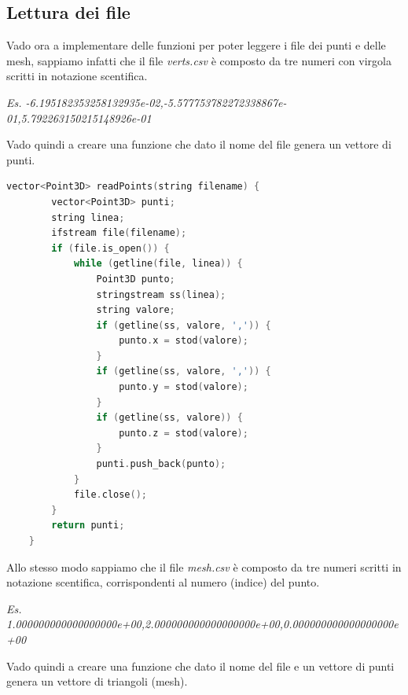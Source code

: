 \documentclass[a4paper]{article}
\begin{document}
\subsection{Lettura dei file}

Vado ora a implementare delle funzioni per poter leggere i file dei punti e delle mesh, sappiamo infatti che il file \emph{verts.csv} è composto da tre numeri con virgola scritti in notazione scentifica.

\vspace{5pt}

\noindent\emph{Es. \footnotesize{-6.195182353258132935e-02,-5.577753782272338867e-01,5.792263150215148926e-01}}

\vspace{7pt}

Vado quindi a creare una funzione che dato il nome del file genera un vettore di punti.

\begin{lstlisting}[language=c++]
    vector<Point3D> readPoints(string filename) {
        vector<Point3D> punti;
        string linea;
        ifstream file(filename);
        if (file.is_open()) {
            while (getline(file, linea)) {
                Point3D punto;
                stringstream ss(linea);
                string valore;
                if (getline(ss, valore, ',')) {
                    punto.x = stod(valore);
                }
                if (getline(ss, valore, ',')) {
                    punto.y = stod(valore);
                }
                if (getline(ss, valore)) {
                    punto.z = stod(valore);
                }
                punti.push_back(punto);
            }
            file.close();
        }
        return punti;
    }
\end{lstlisting}

\newpage

Allo stesso modo sappiamo che il file \emph{mesh.csv} è composto da tre numeri scritti in notazione scentifica, corrispondenti al numero (indice) del punto.

\vspace{5pt}

\noindent\emph{Es. \footnotesize{1.000000000000000000e+00,2.000000000000000000e+00,0.000000000000000000e+00}}

\vspace{7pt}

Vado quindi a creare una funzione che dato il nome del file e un vettore di punti genera un vettore di triangoli (mesh).
\end{document}
